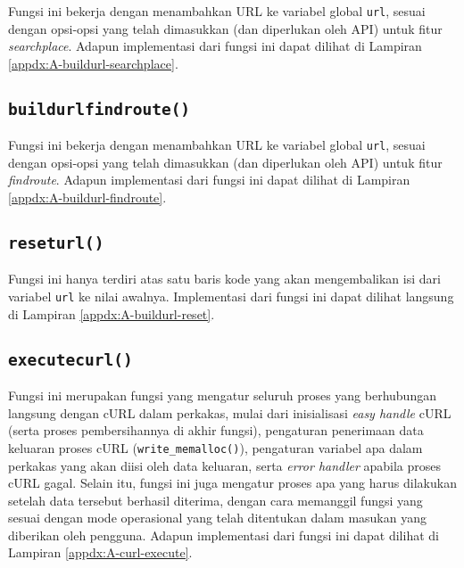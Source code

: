 Fungsi ini bekerja dengan menambahkan URL ke variabel global \verb|url|, sesuai dengan opsi-opsi yang telah dimasukkan (dan diperlukan oleh API) untuk fitur \textit{searchplace}. Adapun implementasi dari fungsi ini dapat dilihat di Lampiran \ref{appdx:A-buildurl-searchplace}.

\subsection{\texttt{build\textunderscore url\textunderscore findroute()}}
\label{sec:testing-implementation-buildurl-findroute}

Fungsi ini bekerja dengan menambahkan URL ke variabel global \verb|url|, sesuai dengan opsi-opsi yang telah dimasukkan (dan diperlukan oleh API) untuk fitur \textit{findroute}. Adapun implementasi dari fungsi ini dapat dilihat di Lampiran \ref{appdx:A-buildurl-findroute}.

\subsection{\texttt{reset\textunderscore url()}}
\label{sec:testing-implementation-buildurl-reset}

Fungsi ini hanya terdiri atas satu baris kode yang akan mengembalikan isi dari variabel \verb|url| ke nilai awalnya. Implementasi dari fungsi ini dapat dilihat langsung di Lampiran \ref{appdx:A-buildurl-reset}.
	
\subsection{\texttt{execute\textunderscore curl()}}
\label{sec:testing-implementation-curl-execute}

Fungsi ini merupakan fungsi yang mengatur seluruh proses yang berhubungan langsung dengan cURL dalam perkakas, mulai dari inisialisasi \textit{easy handle} cURL (serta proses pembersihannya di akhir fungsi), pengaturan penerimaan data keluaran proses cURL (\verb|write_memalloc()|), pengaturan variabel apa dalam perkakas yang akan diisi oleh data keluaran, serta \textit{error handler} apabila proses cURL gagal. Selain itu, fungsi ini juga mengatur proses apa yang harus dilakukan setelah data tersebut berhasil diterima, dengan cara memanggil fungsi yang sesuai dengan mode operasional yang telah ditentukan dalam masukan yang diberikan oleh pengguna. Adapun implementasi dari fungsi ini dapat dilihat di Lampiran \ref{appdx:A-curl-execute}.

